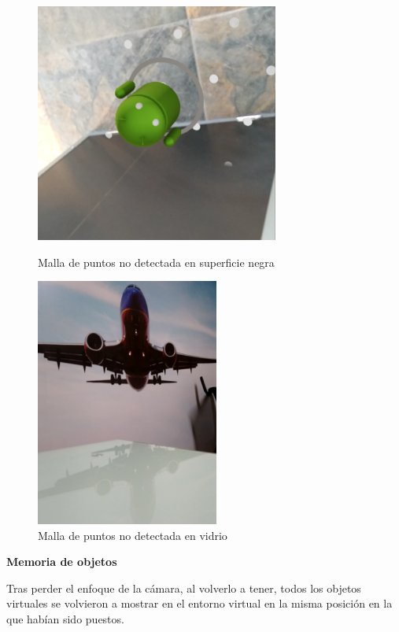 \begin{figure}[H]
	\begin{minipage}{0.48\textwidth}
		\centering
		\includegraphics[width=8cm]{desarrollo/secciones/pruebas/motog6/img/SUPERFICIENEGRA.png}
		\caption{Malla de puntos no detectada en superficie negra}
		\label{fig:motog6supnegra}
	\end{minipage}\hfill
	\begin{minipage}{0.48\textwidth}
		\centering
		\includegraphics[width=6cm]{desarrollo/secciones/pruebas/motog6/img/VIDRIO.png}
		\caption{Malla de puntos no detectada en vidrio}
		\label{fig:motog6vidrio}
	\end{minipage}\hfill
\end{figure}

\clearpage
\textbf{Memoria de objetos} \par
Tras perder el enfoque de la cámara, al volverlo a tener, todos los objetos virtuales se volvieron a mostrar en el entorno virtual en la misma posición en la que habían sido puestos.

